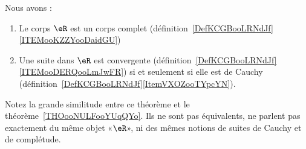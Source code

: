 \begin{theorem} \label{THOooUFVJooYJlieh}
	Nous avons :
	\begin{enumerate}
		\item
		      Le corps \( \eR\) est un corps complet (définition~\ref{DefKCGBooLRNdJf}\ref{ITEMooKZZYooDaidGU})
		\item
		      Une suite dans \( \eR\) est convergente (définition~\ref{DefKCGBooLRNdJf}\ref{ITEMooDERQooLmJwFR}) si et seulement si elle est de Cauchy (définition~\ref{DefKCGBooLRNdJf}\ref{ItemVXOZooTYpcYN}).
	\end{enumerate}
\end{theorem}
Notez la grande similitude entre ce théorème et le théorème~\ref{THOooNULFooYUqQYo}. Ils ne sont pas équivalents, ne parlent pas exactement du même objet «\( \eR\)», ni des mêmes notions de suites de Cauchy et de complétude.

